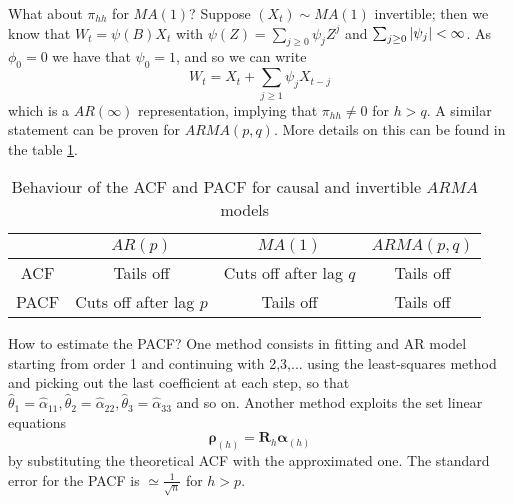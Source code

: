 What about $\pi_{hh}$ for $MA(1)$? Suppose $(X_t)\sim MA(1)$ invertible; then we know that $W_t=\psi(B)X_t$ with $\psi(Z)=\sum_{j\ge0}\psi_jZ^j$ and $\sum_{j\ge0}\left|\psi_j\right|<\infty$. As $\phi_0=0$ we have that $\psi_0=1$, and so we can write
\[
    W_t=X_t+\sum_{j\ge1}\psi_jX_{t-j}    
\]
which is a $AR(\infty)$ representation, implying that $\pi_{hh}\ne0$ for $h>q$. A similar statement can be proven for $ARMA(p,q)$. More details on this can be found in the table \ref{table_ACF_ARMA}. 
\begin{center}
    \begin{table}
        \label{table_ACF_ARMA}
        \begin{tabular}{c c c c}
            \hline
            $ $&$AR(p)$&$MA(1)$&$ARMA(p,q)$\\
            \hline
            ACF&Tails off&Cuts off after lag $q$&Tails off\\
            PACF&Cuts off after lag $p$&Tails off&Tails off\\
            \hline
        \end{tabular}
        \caption{Behaviour of the ACF  and PACF for causal and invertible $ARMA$ models}
    \end{table}
\end{center}

How to estimate the PACF? One method consists in fitting and AR model starting from order 1 and continuing with 2,3,... using the least-squares method and picking out the last coefficient at each step, so that $\hat{\theta}_1=\hat{\alpha}_{11},\hat{\theta}_2=\hat{\alpha}_{22},\hat{\theta}_3=\hat{\alpha}_{33}$ and so on. Another method exploits the set linear equations
\[
    \boldsymbol{\rho}_{(h)}=\boldsymbol{R}_h\boldsymbol{\alpha}_{(h)}  
\]
by substituting the theoretical ACF with the approximated one. The standard error for the PACF is $\simeq\frac{1}{\sqrt{n}}$ for $h>p$.

